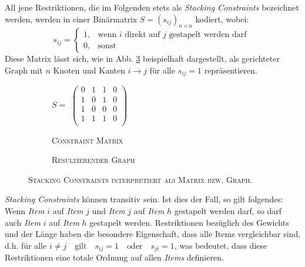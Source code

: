All jene Restriktionen, die im Folgenden stets als \textit{Stacking Constraints} bezeichnet werden, werden in einer Binärmatrix $S = (s_{ij})_{n \times n}$ kodiert, wobei:
\[
    s_{ij} =
\begin{cases}
    1, & \text{wenn $i$ direkt auf $j$ gestapelt werden darf }\\
    0, & \text{sonst}
\end{cases}
\]
Diese Matrix lässt sich, wie in Abb. \ref{fig:matrix_to_graph} beispielhaft dargestellt,
als gerichteter Graph mit $n$ Knoten und Kanten $i \rightarrow j$ für alle $s_{ij} = 1$ repräsentieren.
\begin{figure}[H]
  \begin{subfigure}[b]{0.5\textwidth}
  \centering
    $S =$
    $\left(
    \begin{array}{rrrr}
    0 & 1 & 1 & 0 \\
    1 & 0 & 1 & 0 \\
    1 & 0 & 0 & 0 \\
    1 & 1 & 1 & 0 \\
    \end{array} \right) $
    \caption{\textsc{Constraint Matrix}}
    \label{fig:constraint_matrix}
  \end{subfigure}
  \hfill
  \begin{subfigure}[b]{0.5\textwidth}
  \centering
    \caption{\textsc{Resultierender Graph}}
    \label{fig:resulting_graph}
  \end{subfigure}
  \caption{\textsc{Stacking Constraints interpretiert als Matrix bzw. Graph.}}
  \label{fig:matrix_to_graph}
\end{figure}
\textit{Stacking Constraints} können transitiv sein. Ist dies der Fall, so gilt folgendes:\newline
Wenn \textit{Item} $i$ auf \textit{Item} $j$ und \textit{Item} $j$ auf \textit{Item} $h$ gestapelt werden darf,
so darf auch \textit{Item} $i$ auf \textit{Item} $h$ gestapelt werden.\newline
Restriktionen bezüglich des Gewichts und der Länge haben die besondere Eigenschaft, dass alle Items vergleichbar sind, d.h. für alle $i \neq j  \quad \text{gilt} \quad s_{ij} = 1 \quad \text{oder} \quad s_{ji} = 1$, was bedeutet, dass diese Restriktionen eine totale Ordnung auf allen \textit{Items} definieren.

